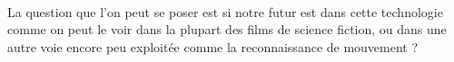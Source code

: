 \documentclass[a4paper, 11pt]{report}
\begin{document}
        \paragraph{}

        La question que l'on peut se poser est si notre futur est dans cette technologie comme on
        peut le voir dans la plupart des films de science fiction, ou dans une autre voie encore peu
        exploitée comme la reconnaissance de mouvement ?

	
	
	
	
	
	
		
	\newpage	
		
	\tableofcontents

		
\end{document}
